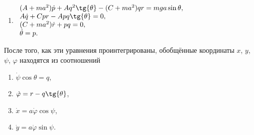 \begin{enumerate}
$L = \frac{1}{2}m\left( \dot{x}^2 + \dot{y}^2 +
a^2(\dot{\theta}^2 + \dot{\psi}^2\sin^2{\theta}) +
2a\dot{x}(\dot{\theta}\cos{\theta}\sin{\psi}+\dot{\psi}\sin{\theta}\cos{\psi}) -
2a\dot{y}(\dot{\theta}\cos{\theta}\cos{\psi}-\dot{\psi}\sin{\theta}\sin{\psi})
\right) + \frac{1}{2}A(\dot{\theta}^2 + \dot{\psi}^2\cos^2{\theta}) +
\frac{1}{2}C(\dot{\psi}\sin{\theta} + \dot{\varphi})^2 -
mga\cos{\theta}$;
\item $\begin{array}{ll}
(A + ma^2)\dot{p} + Aq^2\tg{\theta} -
(C + ma^2)qr = mga\sin{\theta},\\
A\dot{q} + Cpr - Apq\tg{\theta} = 0,\\
(C + ma^2)\dot{r} + pq = 0,\\
\dot{\theta} = p.
\end{array}$
\end{enumerate}
После того, как эти уравнения проинтегрированы, обобщённые координаты
$x$, $y$, $\psi$, $\varphi$ находятся из соотношений
\begin{enumerate}
\item $\dot{\psi}\cos{\theta} = q$,
\item $\dot{\varphi} = r -q\tg{\theta}$,
\item $\dot{x} = a\dot{\varphi}\cos{\psi}$,
\item $\dot{y} = a\dot{\varphi}\sin{\psi}$.
\end{enumerate}
